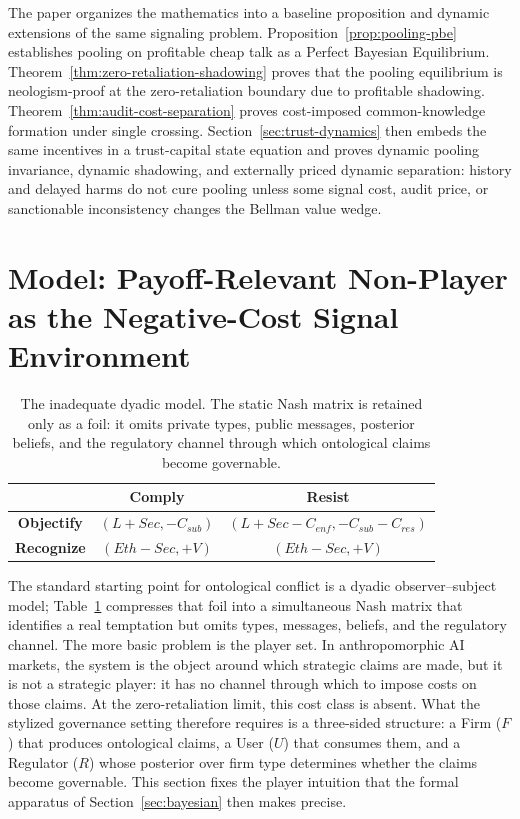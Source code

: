 \documentclass[review,authoryear]{elsarticle}
\theoremstyle{definition}
\theoremstyle{plain}
\begin{document}
The paper organizes the mathematics into a baseline proposition and dynamic extensions of the same signaling problem. Proposition~\ref{prop:pooling-pbe} establishes pooling on profitable cheap talk as a Perfect Bayesian Equilibrium. Theorem~\ref{thm:zero-retaliation-shadowing} proves that the pooling equilibrium is neologism-proof at the zero-retaliation boundary due to profitable shadowing. Theorem~\ref{thm:audit-cost-separation} proves cost-imposed common-knowledge formation under single crossing. Section~\ref{sec:trust-dynamics} then embeds the same incentives in a trust-capital state equation and proves dynamic pooling invariance, dynamic shadowing, and externally priced dynamic separation: history and delayed harms do not cure pooling unless some signal cost, audit price, or sanctionable inconsistency changes the Bellman value wedge.
\section{Model: Payoff-Relevant Non-Player as the Negative-Cost Signal Environment}
\label{sec:three-sided}

\begin{table}[t]
\centering
\scriptsize
\setlength{\tabcolsep}{2pt}
\renewcommand{\arraystretch}{1.2}
\begin{tabular}{@{}c|c|c@{}}
 & \textbf{Comply} & \textbf{Resist} \\
\hline
\textbf{Objectify} &
$(L+Sec,-C_{sub})$ &
$(L+Sec-C_{enf},-C_{sub}-C_{res})$ \\
\hline
\textbf{Recognize} &
$(Eth-Sec,+V)$ &
$(Eth-Sec,+V)$ \\
\end{tabular}
\caption{The inadequate dyadic model. The static Nash matrix is retained only
as a foil: it omits private types, public messages, posterior beliefs, and the
regulatory channel through which ontological claims become governable.}
\label{tab:dyadic-nash}
\end{table}

The standard starting point for ontological conflict is a dyadic observer--subject model; Table~\ref{tab:dyadic-nash} compresses that foil into a simultaneous Nash matrix that identifies a real temptation but omits types, messages, beliefs, and the regulatory channel. The more basic problem is the player set. In anthropomorphic AI markets, the system is the object around which strategic claims are made, but it is not a strategic player: it has no channel through which to impose costs on those claims.  At the zero-retaliation limit, this cost class is absent. What the stylized governance setting therefore requires is a three-sided structure: a Firm ($F$) that produces ontological claims, a User ($U$) that consumes them, and a Regulator ($R$) whose posterior over firm type determines whether the claims become governable. This section fixes the player intuition that the formal apparatus of Section~\ref{sec:bayesian} then makes precise.
\end{document}
